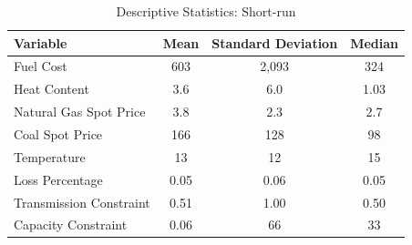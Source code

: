 \documentclass[12pt]{article}
\begin{document}
\begin{table}[htbp]
\centering
\begin{tabular}{lccc}
\toprule
\textbf{Variable} & \textbf{Mean} & \textbf{Standard Deviation} & \textbf{Median} \\
\midrule
Fuel Cost & 603 & 2{,}093 & 324 \\
Heat Content & 3.6 & 6.0 & 1.03 \\
Natural Gas Spot Price & 3.8 & 2.3 & 2.7 \\
Coal Spot Price & 166 & 128 & 98 \\
Temperature & 13 & 12 & 15 \\
Loss Percentage & 0.05 & 0.06 & 0.05 \\
Transmission Constraint & 0.51 & 1.00 & 0.50 \\
Capacity Constraint & 0.06 & 66 & 33 \\
\bottomrule
\end{tabular}
\caption{Descriptive Statistics: Short-run}
\label{ShortTermStats2}
\end{table}
\end{document}
